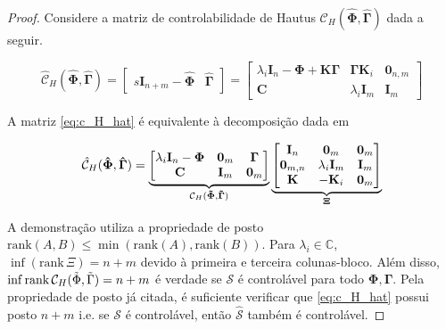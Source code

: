     \begin{proof}
        Considere a matriz de controlabilidade de Hautus $\mathcal{C}_H(\mathbf{\hat \Phi}, \mathbf{\hat \Gamma})$ dada a seguir.
            
        \begin{equation}
            \label{eq:c_H_hat}
            \mathcal{\hat C}_H(\mathbf{\hat \Phi}, \mathbf{\hat \Gamma}) = \begin{bmatrix} s\mathbf{I}_{n + m} - \mathbf{\hat \Phi} & \mathbf{\hat \Gamma}\end{bmatrix} = \begin{bmatrix} \lambda_i \mathbf{I}_n - \mathbf{\Phi} + \mathbf{K} \mathbf{\Gamma} & \mathbf{\Gamma} \mathbf{K}_i & \mathbf{0}_{n, m} \\ \mathbf{C} & \lambda_i \mathbf{I}_{m} & \mathbf{I}_m \end{bmatrix}
        \end{equation}
    
    A matriz \eqref{eq:c_H_hat} é equivalente à decomposição dada em 
    
    \begin{equation}
        \mathcal{\hat C}_H(\mathbf{\hat \Phi}, \mathbf{\hat \Gamma}) = \underbrace{\begin{bmatrix} \lambda_i \mathbf{I}_n - \mathbf{\Phi} & \mathbf{0}_m & \mathbf{\Gamma} \\ \mathbf{C} & \mathbf{I}_{m} & \mathbf{0}_{m} \end{bmatrix}}_{\mathcal{C}_{H}(\mathbf{\Tilde{\Phi}}, \mathbf{\Tilde{\Gamma}})} \underbrace{\begin{bmatrix} \mathbf{I}_n & \mathbf{0}_m & \mathbf{0}_m \\ \mathbf{0}_{m, n} & \lambda_i \mathbf{I}_{m} & \mathbf{I}_{m} \\
        \mathbf{K} & -\mathbf{K}_i & \mathbf{0}_m
        \end{bmatrix}}_{\mathbf{\Xi}}
        \label{eq:decomopsition_hat_C}
    \end{equation}
    
    A demonstração utiliza a propriedade de posto $\mathrm{rank}(A, B) \leq \min(\mathrm{rank}(A), \mathrm{rank}(B))$. Para $\lambda_i \in \mathbb{C}$,  $\inf(\mathrm{rank} \, \Xi) = n + m$ devido à primeira e terceira colunas-bloco. Além disso, $\inf\mathrm{rank} \, \mathcal{C}_{H}(\Tilde{\Phi}, \Tilde{\Gamma}) = n + m$ é verdade se $\mathcal{S}$ é controlável para todo $\mathbf{\Phi}, \mathbf{\Gamma}$. Pela propriedade de posto já citada, é suficiente verificar que \eqref{eq:c_H_hat} possui posto $n+m$ i.e. se $\mathcal{S}$ é controlável, então $\mathcal{\hat S}$ também é controlável.
    
    \end{proof}
